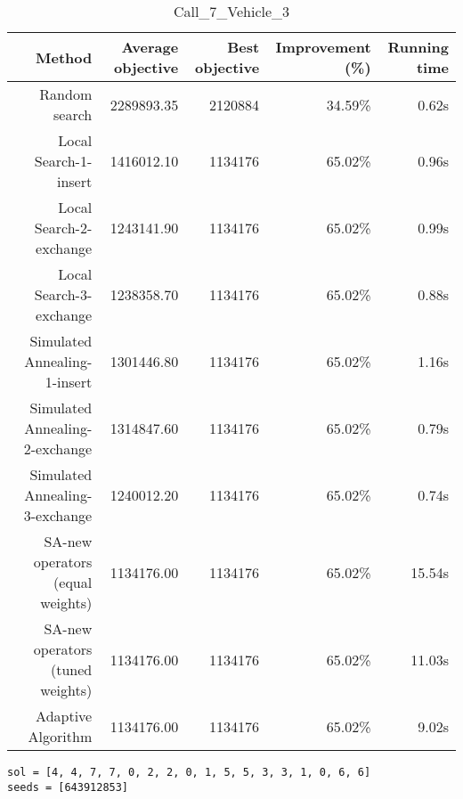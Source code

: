 \begin{table}[ht]
\centering
\caption{Call\_7\_Vehicle\_3}
\label{tab:call7vehicle3}
\begin{tabular}{|r|r|r|r|r|}
Method & Average objective & Best objective & Improvement (\%) & Running time \\
\hline
Random search & 2289893.35 & 2120884 & 34.59\% & 0.62s\\
Local Search-1-insert & 1416012.10 & 1134176 & 65.02\% & 0.96s\\
Local Search-2-exchange & 1243141.90 & 1134176 & 65.02\% & 0.99s\\
Local Search-3-exchange & 1238358.70 & 1134176 & 65.02\% & 0.88s\\
Simulated Annealing-1-insert & 1301446.80 & 1134176 & 65.02\% & 1.16s\\
Simulated Annealing-2-exchange & 1314847.60 & 1134176 & 65.02\% & 0.79s\\
Simulated Annealing-3-exchange & 1240012.20 & 1134176 & 65.02\% & 0.74s\\
SA-new operators (equal weights) & 1134176.00 & 1134176 & 65.02\% & 15.54s\\
SA-new operators (tuned weights) & 1134176.00 & 1134176 & 65.02\% & 11.03s\\
Adaptive Algorithm & 1134176.00 & 1134176 & 65.02\% & 9.02s\\
\end{tabular}%
\end{table}
\begin{lstlisting}[label={lst:call7vehicle3},caption=Optimal solution call\_7\_vehicle\_3]
sol = [4, 4, 7, 7, 0, 2, 2, 0, 1, 5, 5, 3, 3, 1, 0, 6, 6]
seeds = [643912853]
\end{lstlisting}%
\clearpage


